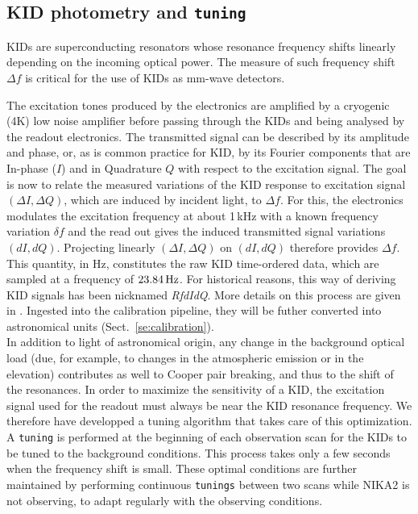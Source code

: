 \subsection{KID photometry and {\tt tuning}}
\label{se:tuning}

KIDs are superconducting resonators whose resonance
frequency shifts linearly depending on the incoming optical power. The
measure of such frequency shift $\Delta f$ is critical for the use of
KIDs as mm-wave detectors. 

The excitation tones produced by the
electronics are amplified by a cryogenic (4K) low noise amplifier
before passing through the KIDs and being analysed by the readout
electronics. The transmitted signal can be described by its
amplitude and phase, or, as is common practice for KID, by its Fourier
components that are In-phase ($I$) and in Quadrature $Q$ with respect to the excitation
signal.
The goal is now to relate the measured variations of the KID response
to excitation signal $(\Delta I, \Delta Q)$, which are induced by incident light, to
$\Delta f$. For this, the electronics modulates the excitation
frequency at about 1\,kHz with a known frequency variation $\delta f$
and the read out gives the induced transmitted signal variations
$(dI, dQ)$. Projecting linearly $(\Delta I, \Delta Q)$ on $(dI, dQ)$ therefore
provides $\Delta f$. This quantity, in Hz, constitutes the raw KID
time-ordered data, which are sampled at a frequency of
$23.84\,\rm{Hz}$. For historical reasons, this way of deriving KID
signals has been nicknamed \emph{RfdIdQ}. More details on this process
are given in \citet{Calvo2013}.
Ingested into the calibration pipeline, they will be futher converted
into astronomical units (Sect.~\ref{se:calibration}).\\

In addition to light of astronomical origin, any change in the
background optical load (due, for example, to changes in
the atmospheric emission or in the elevation) contributes as well to
Cooper pair breaking, and thus to the shift of the resonances. In
order to maximize the sensitivity of a KID, the
excitation signal used for the readout must always be near the KID resonance
frequency. We therefore have developped a tuning algorithm that takes care of
this optimization. A {\tt tuning} is performed at the beginning
of each observation scan for the KIDs to be tuned to the background
conditions.
This process takes only a few seconds
when the frequency shift is small.
These optimal conditions are further maintained by performing
continuous {\tt tunings} between two scans while NIKA2 is not observing, to
adapt regularly with the observing conditions.

